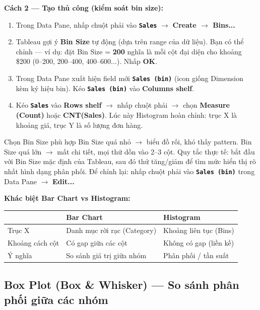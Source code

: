 \documentclass[12pt]{article}
\begin{document}
\noindent \textbf{Cách 2 --- Tạo thủ công (kiểm soát bin size):}
\begin{enumerate}[nosep]
    \item Trong Data Pane, nhấp chuột phải vào \textbf{\texttt{Sales}} $\rightarrow$ \textbf{Create $\rightarrow$ Bins...}
    \item Tableau gợi ý \textbf{Bin Size} tự động (dựa trên range của dữ liệu). Bạn có thể chỉnh --- ví dụ: đặt Bin Size = \textbf{200} nghĩa là mỗi cột đại diện cho khoảng \$200 (0--200, 200--400, 400--600...). Nhấp \textbf{OK}.
    \item Trong Data Pane xuất hiện field mới \textbf{\texttt{Sales (bin)}} (icon giống Dimension kèm ký hiệu bin). Kéo \textbf{\texttt{Sales (bin)}} vào \textbf{Columns shelf}.
    \item Kéo \textbf{\texttt{Sales}} vào \textbf{Rows shelf} $\rightarrow$ nhấp chuột phải $\rightarrow$ chọn \textbf{Measure (Count)} hoặc \textbf{CNT(Sales)}. Lúc này Histogram hoàn chỉnh: trục X là khoảng giá, trục Y là số lượng đơn hàng.
\end{enumerate}

\begin{guidelinebox}{Chọn Bin Size phù hợp}
Bin Size quá nhỏ $\rightarrow$ biểu đồ rối, khó thấy pattern. Bin Size quá lớn $\rightarrow$ mất chi tiết, mọi thứ dồn vào 2--3 cột. Quy tắc thực tế: bắt đầu với Bin Size mặc định của Tableau, sau đó thử tăng/giảm để tìm mức hiển thị rõ nhất hình dạng phân phối. Để chỉnh lại: nhấp chuột phải vào \textbf{\texttt{Sales (bin)}} trong Data Pane $\rightarrow$ \textbf{Edit...}
\end{guidelinebox}

\begin{notebox}
\textbf{Khác biệt Bar Chart vs Histogram:}
\renewcommand{\arraystretch}{1.3}
\begin{tabularx}{\linewidth}{l X X}
\toprule
& \textbf{Bar Chart} & \textbf{Histogram} \\
\midrule
Trục X & Danh mục rời rạc (Category) & Khoảng liên tục (Bins) \\
Khoảng cách cột & Có gap giữa các cột & Không có gap (liền kề) \\
Ý nghĩa & So sánh giá trị giữa nhóm & Phân phối / tần suất \\
\bottomrule
\end{tabularx}
\end{notebox}

\subsection{Box Plot (Box \& Whisker) --- So sánh phân phối giữa các nhóm}
\end{document}

